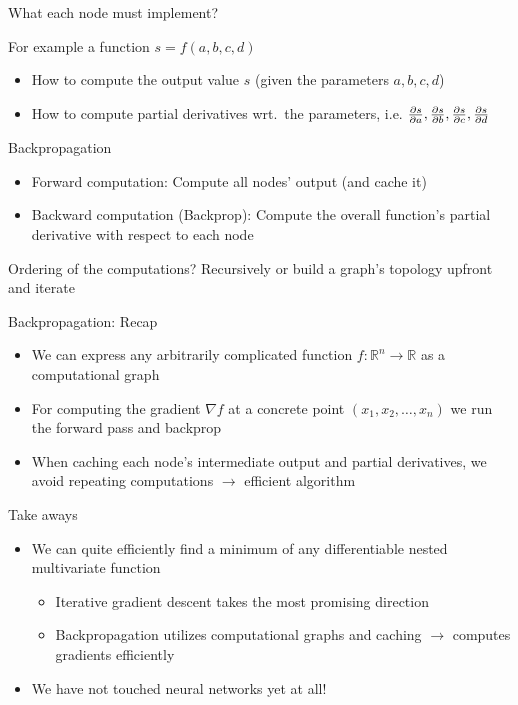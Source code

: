 \documentclass[12pt,aspectratio=169,handout]{beamer}
\begin{document}
\begin{frame}{What each node must implement?}
	
	For example a function $s = f(a, b, c, d)$
	
	\begin{itemize}
		\item How to compute the output value $s$ (given the parameters $a, b, c, d$)
		\item How to compute partial derivatives wrt.\ the parameters, i.e. $\pdv{s}{a}, \pdv{s}{b}, \pdv{s}{c}, \pdv{s}{d}$
	\end{itemize}
	
\end{frame}

\begin{frame}{Backpropagation}
	
	\begin{itemize}
		\item Forward computation: Compute all nodes' output (and cache it)
		\item Backward computation (Backprop): Compute the overall function's partial derivative with respect to each node
	\end{itemize}
	
	\bigskip
	
	Ordering of the computations? Recursively or build a graph's topology upfront and iterate
	
\end{frame}


\begin{frame}{Backpropagation: Recap}
	\begin{itemize}
		\item We can express any arbitrarily complicated function $f: \mathbb{R}^n \to \mathbb{R}$ as a computational graph
		\item For computing the gradient $\nabla f$ at a concrete point $(x_1, x_2, \ldots, x_n)$ we run the forward pass and backprop
		\item When caching each node's intermediate output and partial derivatives, we avoid repeating computations $\to$ efficient algorithm
	\end{itemize}
\end{frame}


\begin{frame}{Take aways}
	
	\begin{itemize}
		
		\item We can quite efficiently find a minimum of any differentiable nested multivariate function
		\begin{itemize}
			\item Iterative gradient descent takes the most promising direction
			\item Backpropagation utilizes computational graphs and caching $\to$ computes gradients efficiently
		\end{itemize}
		\item We have not touched neural networks yet at all!
	\end{itemize}
	
\end{frame}
\end{document}
